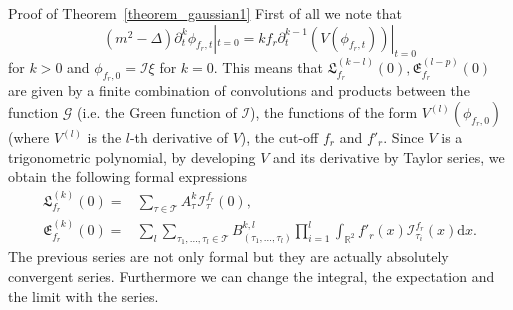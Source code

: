 \documentclass[a4paper,10pt]{article}
\newcommand{\mathd}{\mathrm{d}}
\newenvironment{proof*}[1]{\noindent\textbf{#1\ }}{\hspace*{\fill}$\Box$\medskip}
\begin{document}
\begin{proof*}{Proof of Theorem~\ref{theorem_gaussian1}}
  First of all we note that
  \begin{equation}
    (m^2 - \Delta) \partial^k_t \phi_{f_r, t} |_{t = 0} = k f_r \partial^{k -
    1}_t (V (\phi_{f_r, t})) |_{t = 0} \label{equationcutoff4}
  \end{equation}
  for $k > 0$ and $\phi_{f_r, 0} =\mathcal{I} \xi$ for $k = 0$. This means
  that $\mathfrak{L}^{(k - l)}_{f_r} (0), \mathfrak{E}^{(l - p)}_{f_r} (0)$
  are given by a finite combination of convolutions and products between the
  function $\mathcal{G}$ (i.e. the Green function of $\mathcal{I}$), the
  functions of the form $V^{(l)} (\phi_{f_r, 0})$ (where $V^{(l)}$ is the
  $l$-th derivative of $V$), the cut-off $f_r$ and $f'_r$. Since $V$ is a
  trigonometric polynomial, by developing $V$ and its derivative by Taylor
  series, we obtain the following formal expressions
  \begin{equation}
    \begin{aligned}
      \mathfrak{L}^{(k)}_{f_r} (0) = & \sum_{\tau \in \mathcal{T}} A^k_{\tau}
      \mathcal{I}_{\tau}^{f_r} (0),\\
      \mathfrak{E}^{(k)}_{f_r} (0) = & \sum_l \sum_{\tau_1, \ldots, \tau_l \in
      \mathcal{T}} B^{k, l}_{(\tau_1, \ldots, \tau_l)} \prod_{i = 1}^l
      \int_{\mathbb{R}^2} f'_r (x) \mathcal{I}_{\tau_i}^{f_r} (x) \mathd x.
    \end{aligned}
    \label{equationcutoff5}
  \end{equation}
  The previous series are not only formal but they are actually absolutely
  convergent series. Furthermore we can change the integral, the expectation
  and the limit with the series.
  

\end{proof*}
\end{document}
